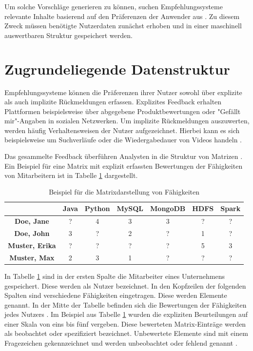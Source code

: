 Um solche Vorschläge generieren zu können, suchen Empfehlungssysteme relevante Inhalte basierend auf den Präferenzen der Anwender aus \cite[S. 1]{das:2017}. Zu diesem Zweck müssen benötigte Nutzerdaten zunächst erhoben und in einer maschinell auswertbaren Struktur gespeichert werden.

\section{Zugrundeliegende Datenstruktur}
\label{ch:empfehlungssysteme:arbeitsweise}
Empfehlungssysteme können die Präferenzen ihrer Nutzer sowohl über explizite als auch implizite Rückmeldungen erfassen. Explizites Feedback erhalten Plattformen beispielsweise über abgegebene Produktbewertungen oder "Gefällt mir"-Angaben in sozialen Netzwerken. Um implizite Rückmeldungen auszuwerten, werden häufig Verhaltensweisen der Nutzer aufgezeichnet. Hierbei kann es sich beispielsweise um Suchverläufe oder die Wiedergabedauer von Videos handeln \cite[S. 3]{pu:2012}.

Das gesammelte Feedback überführen Analysten in die Struktur von Matrizen \cite[S. 11f.]{recommenderSystems:2016}. Ein Beispiel für eine Matrix mit explizit erfassten Bewertungen der Fähigkeiten von Mitarbeitern ist in Tabelle \ref{tbl:empfehlungssysteme:arbeitsweise:tbl1} dargestellt.

\begin{table}[h]
	\centering
	\begin{tabular}{c|c|c|c|c|c|c}
	 & \textbf{Java} & \textbf{Python} & \textbf{MySQL} & \textbf{MongoDB} & \textbf{HDFS} & \textbf{Spark}\\ 
	\hline
	\textbf{Doe, Jane}     & ? & 4 & 3 & 3 & ? & ?\\
	\textbf{Doe, John}     & 3 & ? & 2 & ? & 1 & ?\\
	\textbf{Muster, Erika} & ? & ? & ? & ? & 5 & 3\\
	\textbf{Muster, Max}   & 2 & 3 & 1 & ? & ? & ?
	\end{tabular}
	\caption{Beispiel für die Matrixdarstellung von Fähigkeiten}
	\label{tbl:empfehlungssysteme:arbeitsweise:tbl1}
\end{table}

In Tabelle \ref{tbl:empfehlungssysteme:arbeitsweise:tbl1} sind in der ersten Spalte die Mitarbeiter eines Unternehmens gespeichert. Diese werden als Nutzer bezeichnet. In den Kopfzeilen der folgenden Spalten sind verschiedene Fähigkeiten eingetragen. Diese werden Elemente genannt. In der Mitte der Tabelle befinden sich die Bewertungen der Fähigkeiten jedes Nutzers \cite[S. 1f.]{strub:2016}. Im Beispiel aus Tabelle \ref{tbl:empfehlungssysteme:arbeitsweise:tbl1} wurden die expliziten Beurteilungen auf einer Skala von eins bis fünf vergeben. Diese bewerteten Matrix-Einträge werden  als beobachtet oder spezifiziert bezeichnet. Unbewertete Elemente sind mit einem Fragezeichen gekennzeichnet und werden unbeobachtet oder fehlend genannt \cite[S. 8]{recommenderSystems:2016}.

